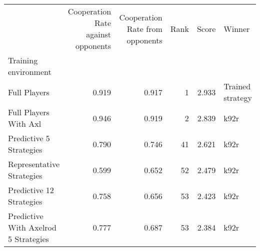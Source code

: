 \begin{tabular}{lrrrrl}
\toprule
{} &  Cooperation Rate against opponents &  Cooperation Rate from opponents &  Rank &  Score &            Winner \\
Training environment                 &                                     &                                  &       &        &                   \\
\midrule
Full Players                         &                               0.919 &                            0.917 &     1 &  2.933 &  Trained strategy \\
Full Players With Axl                &                               0.946 &                            0.919 &     2 &  2.839 &              k92r \\
Predictive 5 Strategies              &                               0.790 &                            0.746 &    41 &  2.621 &              k92r \\
Representative Strategies            &                               0.599 &                            0.652 &    52 &  2.479 &              k92r \\
Predictive 12 Strategies             &                               0.758 &                            0.656 &    53 &  2.423 &              k92r \\
Predictive With Axelrod 5 Strategies &                               0.777 &                            0.687 &    53 &  2.384 &              k92r \\
\bottomrule
\end{tabular}
